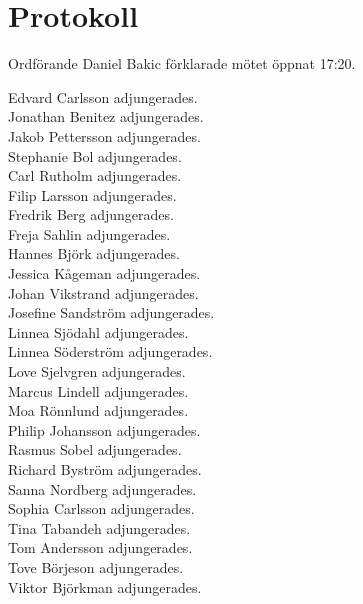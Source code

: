 \documentclass[10pt]{article}
\def\mo{Daniel Bakic}
\begin{document}
\section*{Protokoll}
\begin{paragrafer}
	Ordförande {\mo} förklarade mötet öppnat 17:20.

	{\valavmo}

	{\valavms}

	{\valavj}

	{\tosg}

	Edvard Carlsson adjungerades.\\
	Jonathan Benitez adjungerades.\\
	Jakob Pettersson adjungerades.\\
	Stephanie Bol adjungerades.\\
	Carl Rutholm adjungerades.\\
	Filip Larsson adjungerades.\\
	Fredrik Berg adjungerades.\\
	Freja Sahlin adjungerades.\\
	Hannes Björk adjungerades.\\
	Jessica Kågeman adjungerades.\\
	Johan Vikstrand adjungerades.\\
	Josefine Sandström adjungerades.\\
	Linnea Sjödahl adjungerades.\\
	Linnea Söderström adjungerades.\\
	Love Sjelvgren adjungerades.\\
	Marcus Lindell adjungerades.\\
	Moa Rönnlund adjungerades.\\
	Philip Johansson adjungerades.\\
	Rasmus Sobel adjungerades.\\
	Richard Byström adjungerades.\\
	Sanna Nordberg adjungerades.\\
	Sophia Carlsson adjungerades.\\
	Tina Tabandeh adjungerades.\\
	Tom Andersson adjungerades.\\
	Tove Börjeson adjungerades.\\
	Viktor Björkman adjungerades.\\
	

\end{paragrafer}
\end{document}
